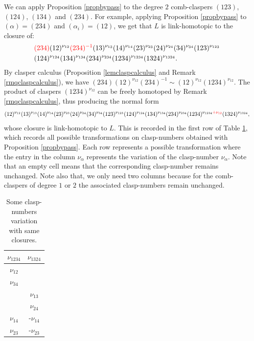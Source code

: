 \documentclass[11pt, a4paper, twoside,reqno]{amsart}
\begin{document}
We can apply Proposition \ref{propbypass} to the degree $2$ comb-claspers $(123)$, $(124)$, $(134)$ and $(234)$. For example, applying Proposition \ref{propbypass} to $(\alpha)=(234)$ and $(\alpha_i)=(12)$, we get that $L$ is link-homotopic to the closure of:
\begin{align*}
   &{\color{red}(234)}(12)^{\nu_{12}}{\color{red}(234)^{-1}}(13)^{\nu_{13}}(14)^{\nu_{14}}(23)^{\nu_{23}}(24)^{\nu_{24}}(34)^{\nu_{34}}(123)^{\nu_{123}}\\&(124)^{\nu_{124}}(134)^{\nu_{134}}(234)^{\nu_{234}}(1234)^{\nu_{1234}}(1324)^{\nu_{1324}}.
\end{align*}
By clasper calculus (Proposition \ref{lemclaspcalculus} and Remark \ref{rmqclaspcalculus}), we have $(234)(12)^{\nu_{12}}(234)^{-1}\sim(12)^{\nu_{12}}(1234)^{\nu_{12}}$. The product of claspers $(1234)^{\nu_{12}}$ can be freely homotoped by Remark \ref{rmqclaspcalculus}, thus producing the normal form 
$$(12)^{\nu_{12}}(13)^{\nu_{13}}(14)^{\nu_{14}}(23)^{\nu_{23}}(24)^{\nu_{24}}(34)^{\nu_{34}}(123)^{\nu_{123}}(124)^{\nu_{124}}(134)^{\nu_{134}}(234)^{\nu_{234}}(1234)^{\nu_{1234}{\color{red}+\nu_{12}}}(1324)^{\nu_{1324}},$$
whose closure is link-homotopic to $L$.
This is recorded in the first row of Table \ref{tableau1}, which records all possible transformations on clasp-numbers obtained with Proposition \ref{propbypass}.  Each row represents a possible transformation where the entry in the column $\nu_{\alpha}$ represents the variation of the clasp-number $\nu_{\alpha}$. Note that an empty cell means that the corresponding clasp-number remains unchanged. Note also that, we only need two columns because for the comb-claspers of degree $1$ or $2$ the associated clasp-numbers remain unchanged.
\begin{table}[!htbp]
\centering
\begin{tabular}{|c|c|}
\hline
$\nu_{1234}$&$\nu_{1324}$\\
\hline\hline
$\nu_{12}$&\\
\hline
$\nu_{34}$&\\
\hline
&$\nu_{13}$\\
\hline
&$\nu_{24}$\\
\hline
$\nu_{14}$&-$\nu_{14}$\\
\hline
$\nu_{23}$&-$\nu_{23}$\\
\hline
\end{tabular}
\vspace{0.08cm}
\caption{Some clasp-numbers variation with same closures.}
\label{tableau1}
\end{table}
\end{document}
